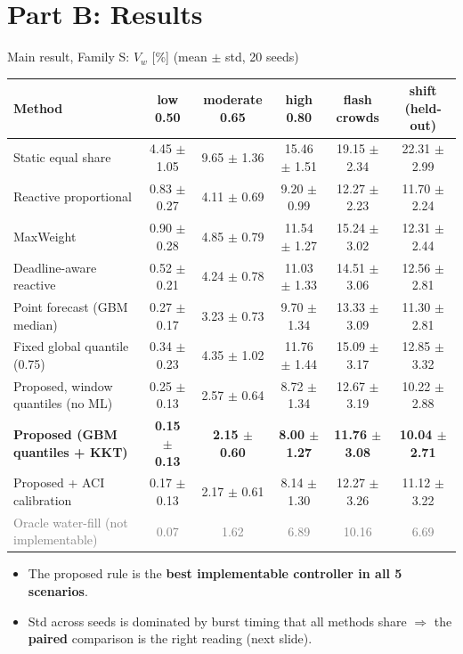 \documentclass[aspectratio=169,11pt,xcolor=table]{beamer}
\begin{document}
\section{Part B: Results}

\begin{frame}{Main result, Family S: $V_w$ [\%] (mean $\pm$ std, 20 seeds)}
  \scriptsize
  \centering
  \begin{tabular}{lccccc}
    \toprule
    Method & low 0.50 & moderate 0.65 & high 0.80 & flash crowds & shift (held-out) \\
    \midrule
    Static equal share & 4.45 $\pm$ 1.05 & 9.65 $\pm$ 1.36 & 15.46 $\pm$ 1.51 & 19.15 $\pm$ 2.34 & 22.31 $\pm$ 2.99 \\
    Reactive proportional & 0.83 $\pm$ 0.27 & 4.11 $\pm$ 0.69 & 9.20 $\pm$ 0.99 & 12.27 $\pm$ 2.23 & 11.70 $\pm$ 2.24 \\
    MaxWeight & 0.90 $\pm$ 0.28 & 4.85 $\pm$ 0.79 & 11.54 $\pm$ 1.27 & 15.24 $\pm$ 3.02 & 12.31 $\pm$ 2.44 \\
    Deadline-aware reactive & 0.52 $\pm$ 0.21 & 4.24 $\pm$ 0.78 & 11.03 $\pm$ 1.33 & 14.51 $\pm$ 3.06 & 12.56 $\pm$ 2.81 \\
    Point forecast (GBM median) & 0.27 $\pm$ 0.17 & 3.23 $\pm$ 0.73 & 9.70 $\pm$ 1.34 & 13.33 $\pm$ 3.09 & 11.30 $\pm$ 2.81 \\
    Fixed global quantile (0.75) & 0.34 $\pm$ 0.23 & 4.35 $\pm$ 1.02 & 11.76 $\pm$ 1.44 & 15.09 $\pm$ 3.17 & 12.85 $\pm$ 3.32 \\
    Proposed, window quantiles (no ML) & 0.25 $\pm$ 0.13 & 2.57 $\pm$ 0.64 & 8.72 $\pm$ 1.34 & 12.67 $\pm$ 3.19 & 10.22 $\pm$ 2.88 \\
    \rowcolor{good!15}\textbf{Proposed (GBM quantiles + KKT)} & \textbf{0.15 $\pm$ 0.13} & \textbf{2.15 $\pm$ 0.60} & \textbf{8.00 $\pm$ 1.27} & \textbf{11.76 $\pm$ 3.08} & \textbf{10.04 $\pm$ 2.71} \\
    Proposed + ACI calibration & 0.17 $\pm$ 0.13 & 2.17 $\pm$ 0.61 & 8.14 $\pm$ 1.30 & 12.27 $\pm$ 3.26 & 11.12 $\pm$ 3.22 \\
    \midrule
    \textcolor{gray}{Oracle water-fill (not implementable)} & \textcolor{gray}{0.07} & \textcolor{gray}{1.62} & \textcolor{gray}{6.89} & \textcolor{gray}{10.16} & \textcolor{gray}{6.69} \\
    \bottomrule
  \end{tabular}
  \normalsize
  \vspace{0.6em}
  \begin{itemize}
    \item The proposed rule is the \textbf{best implementable controller in all 5 scenarios}.
    \item Std across seeds is dominated by burst timing that all methods share $\Rightarrow$ the \textbf{paired} comparison is the right reading (next slide).
  \end{itemize}
\end{frame}
\end{document}
